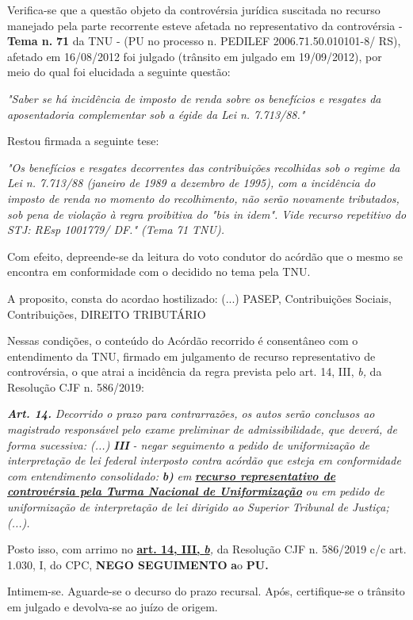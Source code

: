 \documentclass[12pt]{article}
\begin{document}
\justifying
\noindent Verifica-se que a questão objeto da controvérsia jurídica suscitada no recurso manejado pela parte recorrente esteve afetada no representativo da controvérsia - \textbf{Tema n. }\textbf{71} da TNU - (PU no processo n. PEDILEF 2006.71.50.010101-8/ RS),  afetado em 16/08/2012 foi julgado (trânsito em julgado em 19/09/2012), por meio do qual foi elucidada a seguinte questão:

\noindent \textit{"Saber se há incidência de imposto de renda sobre os benefícios e resgates da aposentadoria complementar sob a égide da Lei n. 7.713/88."}

\noindent Restou firmada a seguinte tese:

\noindent \textit{"Os benefícios e resgates decorrentes das contribuições recolhidas sob o regime da Lei n. 7.713/88 (janeiro de 1989 a dezembro de 1995), com a incidência do imposto de renda no momento do recolhimento, não serão novamente tributados, sob pena de violação à regra proibitiva do "bis in idem". Vide recurso repetitivo do STJ: REsp 1001779/ DF." (Tema 71 TNU).}

\noindent Com efeito, depreende-se da leitura do voto condutor do acórdão que o mesmo se encontra em conformidade com o decidido no  tema pela TNU.

\noindent A proposito, consta do acordao hostilizado: (...) PASEP, Contribuições Sociais, Contribuições, DIREITO TRIBUTÁRIO

\noindent Nessas condições, o conteúdo do Acórdão recorrido é consentâneo com o entendimento da TNU, firmado em julgamento de recurso representativo de controvérsia, o que atrai a incidência da regra prevista pelo art. 14, III, \textit{b,} da Resolução CJF n. 586/2019:

\noindent \textit{\textbf{Art. 14.}}\textit{ Decorrido o prazo para contrarrazões, os autos serão conclusos ao magistrado responsável pelo exame preliminar de admissibilidade, que deverá, de forma sucessiva: (...) }\textit{\textbf{III }}\textit{- negar seguimento a pedido de uniformização de interpretação de lei federal interposto contra acórdão que esteja em conformidade com entendimento consolidado: }\textit{\textbf{b)}}\textit{ em }\uline{\textit{\textbf{recurso representativo de controvérsia pela Turma Nacional de Uniformização}}}\textit{ ou em pedido de uniformização de interpretação de lei dirigido ao Superior Tribunal de Justiça;(...).}

\noindent Posto isso, com arrimo no \uline{\textbf{art. 14, III, }}\uline{\textit{\textbf{b}}}\textit{,} da Resolução CJF n. 586/2019 c/c art. 1.030, I, do CPC, \textbf{NEGO SEGUIMENTO }\textbf{a}o\textbf{ PU}\textbf{.}

\noindent Intimem-se. Aguarde-se o decurso do prazo recursal. Após, certifique-se o trânsito em julgado e devolva-se ao juízo de origem.
\end{document}
